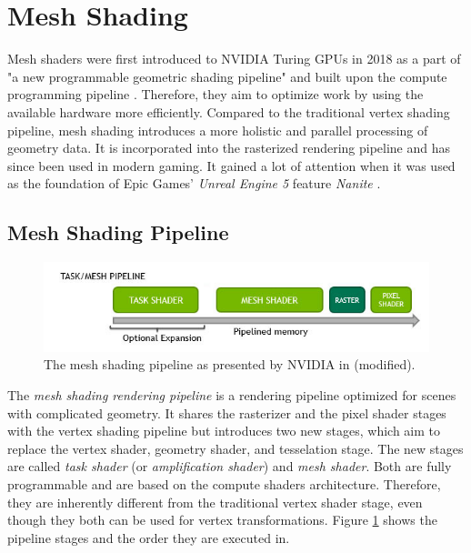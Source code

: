 \section{Mesh Shading}  \label{sec-mesh-shading}

Mesh shaders were first introduced to NVIDIA Turing \ac{GPU}s in 2018 as a part of "a new programmable 
geometric shading pipeline" and built upon the compute programming pipeline \cite{Kubisch2018}. 
Therefore, they aim to optimize work by using the available hardware more efficiently. Compared to the 
traditional vertex shading pipeline, mesh shading introduces a more holistic and parallel processing of 
geometry data. It is incorporated into the rasterized rendering pipeline and has since been used in modern 
gaming. It gained a lot of attention when it was used as the foundation of Epic Games' \emph{Unreal Engine 5} 
feature \emph{Nanite} \cite{Karis2021}.\\


\subsection*{Mesh Shading Pipeline} \label{subsec-the-mesh-shading-pipeline}

\begin{figure}[h]
    \centering
    \includegraphics[width=\linewidth]{images/graphics/mesh-rendering-pipeline.jpg}
    \caption{The mesh shading pipeline as presented by NVIDIA in \cite{Kubisch2018} (modified).}
    \label{fig:mesh-rendering-pipeline}
\end{figure}

\noindent
The \emph{mesh shading rendering pipeline} is a rendering pipeline optimized for scenes with complicated 
geometry. It shares the rasterizer and the pixel shader stages with the vertex shading pipeline but 
introduces two new stages, which aim to replace the vertex shader, geometry shader, and tesselation stage.
The new stages are called \emph{task shader} (or \emph{amplification shader}) and \emph{mesh shader}. Both 
are fully programmable and are based on the compute shaders architecture. Therefore, they are inherently 
different from the traditional vertex shader stage, even though they both can be used for vertex 
transformations. Figure \ref{fig:mesh-rendering-pipeline} shows the pipeline stages and the order they are 
executed in. \\

